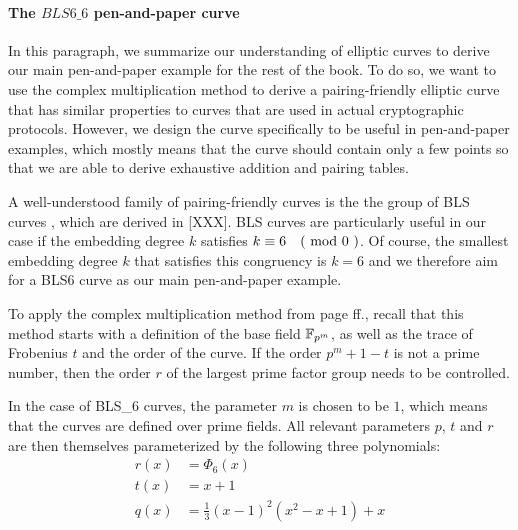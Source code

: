 
\paragraph{The $BLS6\_6$ pen-and-paper curve}\label{BLS6}

In this paragraph, we summarize our understanding of elliptic curves to derive our main pen-and-paper example for the rest of the book. To do so, we want to use the complex multiplication method to derive a pairing-friendly elliptic curve that has similar properties to curves that are used in actual cryptographic protocols. However, we design the curve specifically to be useful in pen-and-paper examples, which mostly means that the curve should contain only a few points so that we are able to derive exhaustive addition and pairing tables.

A well-understood family of pairing-friendly curves is the the group of BLS curves , which are derived in [XXX]. BLS curves are particularly useful in our case if the embedding degree $k$ satisfies $k \equiv 6 \quad \text{( mod } 0 \text{ )}$. Of course, the smallest embedding degree $k$ that satisfies this congruency is $k=6$ and we therefore aim for a BLS6 curve as our main pen-and-paper example. 

To apply the complex multiplication method from page \pageref{complex-multiplication-method} ff., recall that this method starts with a definition of the base field $\mathbb{F}_{p^m}$, as well as the trace of Frobenius $t$ and the order of the curve. If the order $p^m+1-t$ is not a prime number, then the order $r$ of the largest prime factor group needs to be controlled. 

In the case of BLS\_6 curves, the parameter $m$ is chosen to be $1$, which means that the curves are defined over prime fields. All relevant parameters $p$, $t$ and $r$ are then themselves parameterized by the following three polynomials:
\begin{equation}
\begin{split}
r(x) &= \Phi_6(x)\\
t(x) &= x+1\\
q(x) &= \frac{1}{3}(x-1)^2(x^{2}-x+1) +x
\end{split}
\end{equation}


